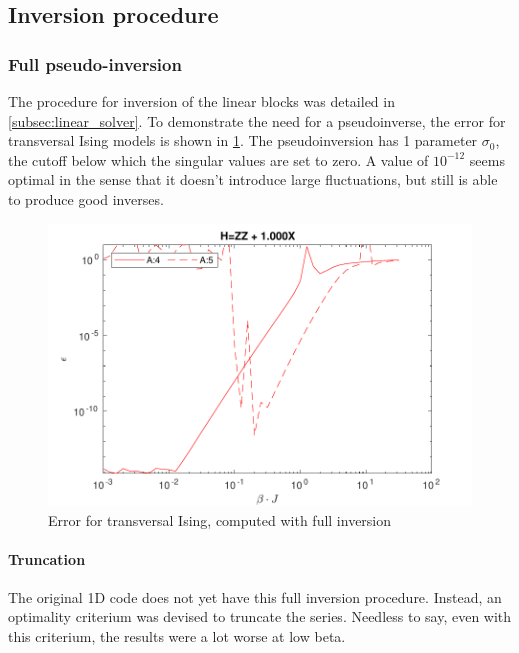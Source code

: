 \subsection{Inversion procedure}\label{subsec:inversion_procedure}

\subsubsection{Full pseudo-inversion}

The procedure for inversion of the linear blocks was detailed in \cref{subsec:linear_solver}. To demonstrate the need for a pseudoinverse, the error for transversal Ising models is shown in \cref{benc:fig:fullinv}. The pseudoinversion has 1 parameter $\sigma_0$, the cutoff below which the singular values are set to zero. A value of $10^{-12}$ seems optimal in the sense that it doesn't introduce large fluctuations, but still is able to produce good inverses.

\begin{figure}[H]
    \center
    \includegraphics[width=\textwidth]{Figuren/benchmarking/t_ising_full_inverse.pdf }
    \caption{Error for transversal Ising, computed with full inversion }
    \label{benc:fig:fullinv}
\end{figure}

\paragraph{Truncation}

The original 1D code does not yet have this full inversion procedure. Instead, an optimality criterium was devised to truncate the series. Needless to say, even with this criterium, the results were a lot worse at low beta.

